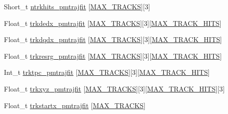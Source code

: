 \begin{DoxyCompactItemize}
Short\-\_\-t \hyperlink{classanatree_a14cddd686ef1522843822efe5bf97f59}{ntrkhits\-\_\-pmtrajfit} \mbox{[}\hyperlink{anatree__core__v09410002_8h_a327fd4e796e4a0d78947524c96e4362e}{M\-A\-X\-\_\-\-T\-R\-A\-C\-K\-S}\mbox{]}\mbox{[}3\mbox{]}
\item 
Float\-\_\-t \hyperlink{classanatree_a0cc5a69f4fbc0a37f485ebc28bbbcc80}{trkdedx\-\_\-pmtrajfit} \mbox{[}\hyperlink{anatree__core__v09410002_8h_a327fd4e796e4a0d78947524c96e4362e}{M\-A\-X\-\_\-\-T\-R\-A\-C\-K\-S}\mbox{]}\mbox{[}3\mbox{]}\mbox{[}\hyperlink{anatree__core__v09410002_8h_ae75eb9050f16aa034339f05572523070}{M\-A\-X\-\_\-\-T\-R\-A\-C\-K\-\_\-\-H\-I\-T\-S}\mbox{]}
\item 
Float\-\_\-t \hyperlink{classanatree_a187b98e01b9145aaed5c8b07246d979b}{trkdqdx\-\_\-pmtrajfit} \mbox{[}\hyperlink{anatree__core__v09410002_8h_a327fd4e796e4a0d78947524c96e4362e}{M\-A\-X\-\_\-\-T\-R\-A\-C\-K\-S}\mbox{]}\mbox{[}3\mbox{]}\mbox{[}\hyperlink{anatree__core__v09410002_8h_ae75eb9050f16aa034339f05572523070}{M\-A\-X\-\_\-\-T\-R\-A\-C\-K\-\_\-\-H\-I\-T\-S}\mbox{]}
\item 
Float\-\_\-t \hyperlink{classanatree_aed6abd04eb5db5adb7c2c1431885545b}{trkresrg\-\_\-pmtrajfit} \mbox{[}\hyperlink{anatree__core__v09410002_8h_a327fd4e796e4a0d78947524c96e4362e}{M\-A\-X\-\_\-\-T\-R\-A\-C\-K\-S}\mbox{]}\mbox{[}3\mbox{]}\mbox{[}\hyperlink{anatree__core__v09410002_8h_ae75eb9050f16aa034339f05572523070}{M\-A\-X\-\_\-\-T\-R\-A\-C\-K\-\_\-\-H\-I\-T\-S}\mbox{]}
\item 
Int\-\_\-t \hyperlink{classanatree_a992b438d7c09f5486fa6ff7bf2ef614f}{trktpc\-\_\-pmtrajfit} \mbox{[}\hyperlink{anatree__core__v09410002_8h_a327fd4e796e4a0d78947524c96e4362e}{M\-A\-X\-\_\-\-T\-R\-A\-C\-K\-S}\mbox{]}\mbox{[}3\mbox{]}\mbox{[}\hyperlink{anatree__core__v09410002_8h_ae75eb9050f16aa034339f05572523070}{M\-A\-X\-\_\-\-T\-R\-A\-C\-K\-\_\-\-H\-I\-T\-S}\mbox{]}
\item 
Float\-\_\-t \hyperlink{classanatree_aff289f04ed93258fc373d3971a9f539a}{trkxyz\-\_\-pmtrajfit} \mbox{[}\hyperlink{anatree__core__v09410002_8h_a327fd4e796e4a0d78947524c96e4362e}{M\-A\-X\-\_\-\-T\-R\-A\-C\-K\-S}\mbox{]}\mbox{[}3\mbox{]}\mbox{[}\hyperlink{anatree__core__v09410002_8h_ae75eb9050f16aa034339f05572523070}{M\-A\-X\-\_\-\-T\-R\-A\-C\-K\-\_\-\-H\-I\-T\-S}\mbox{]}\mbox{[}3\mbox{]}
\item 
Float\-\_\-t \hyperlink{classanatree_a1f9c28419a80caf6661ba03dbbbc2c34}{trkstartx\-\_\-pmtrajfit} \mbox{[}\hyperlink{anatree__core__v09410002_8h_a327fd4e796e4a0d78947524c96e4362e}{M\-A\-X\-\_\-\-T\-R\-A\-C\-K\-S}\mbox{]}

\end{DoxyCompactItemize}

